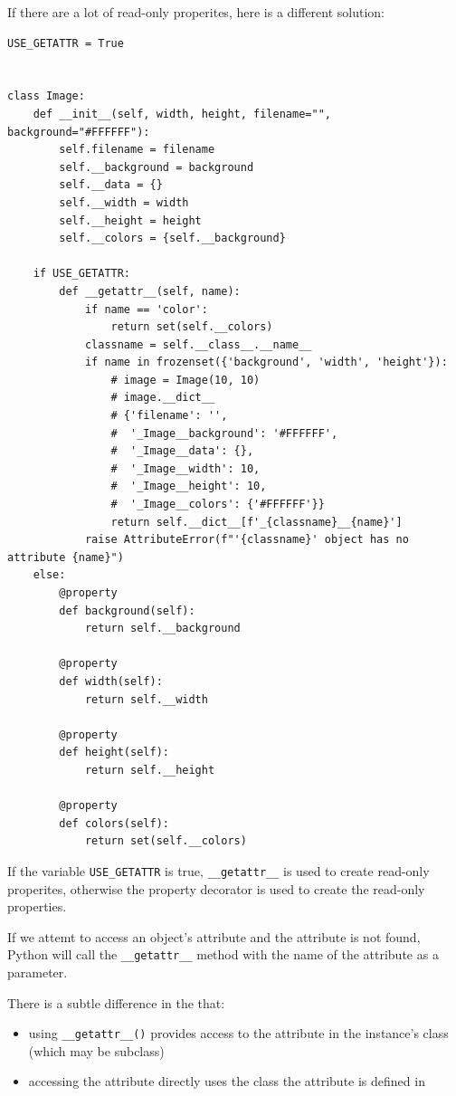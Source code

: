 If there are a lot of read-only properites, here is a different solution:
\begin{lstlisting}
USE_GETATTR = True


class Image:
    def __init__(self, width, height, filename="", background="#FFFFFF"):
        self.filename = filename
        self.__background = background
        self.__data = {}
        self.__width = width
        self.__height = height
        self.__colors = {self.__background}

    if USE_GETATTR:
        def __getattr__(self, name):
            if name == 'color':
                return set(self.__colors)
            classname = self.__class__.__name__
            if name in frozenset({'background', 'width', 'height'}):
                # image = Image(10, 10)
                # image.__dict__
                # {'filename': '',
                #  '_Image__background': '#FFFFFF',
                #  '_Image__data': {},
                #  '_Image__width': 10,
                #  '_Image__height': 10,
                #  '_Image__colors': {'#FFFFFF'}}
                return self.__dict__[f'_{classname}__{name}']
            raise AttributeError(f"'{classname}' object has no attribute {name}")
    else:
        @property
        def background(self):
            return self.__background

        @property
        def width(self):
            return self.__width

        @property
        def height(self):
            return self.__height

        @property
        def colors(self):
            return set(self.__colors)
\end{lstlisting}

If the variable \verb|USE_GETATTR| is true, \verb|__getattr__| is used to create read-only properites, otherwise the property decorator is used to create the read-only properties.

If we attemt to access an object's attribute and the attribute is not found, Python will call the \verb|__getattr__| method with the name of the attribute as a parameter.


There is a subtle difference in the that:
\begin{itemize}
\item using \verb|__getattr__()| provides access to the attribute in the instance's class (which may be subclass)
\item accessing the attribute directly uses the class the attribute is defined in 
\end{itemize}



